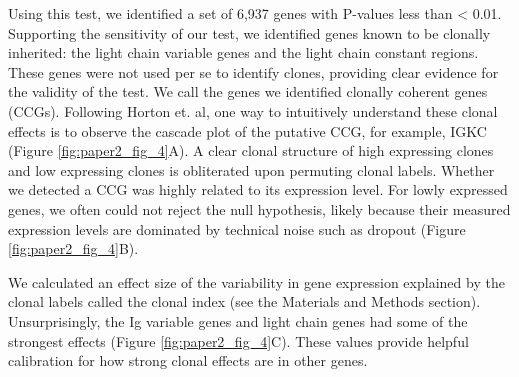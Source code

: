 Using this test, we identified a set of 6,937 genes with P-values less than < 0.01. Supporting the sensitivity of our test, we identified genes known to be clonally inherited: the light chain variable genes and the light chain constant regions. These genes were not used per se to identify clones, providing clear evidence for the validity of the test. We call the genes we identified clonally coherent genes (CCGs). Following Horton et. al\cite{horton_multiplexed_2018}, one way to intuitively understand these clonal effects is to observe the cascade plot of the putative CCG, for example, IGKC  (Figure \ref{fig:paper2_fig_4}A). A clear clonal structure of high expressing clones and low expressing clones is obliterated upon permuting clonal labels. Whether we detected a CCG was highly related to its expression level. For lowly expressed genes, we often could not reject the null hypothesis, likely because their measured expression levels are dominated by technical noise such as dropout (Figure \ref{fig:paper2_fig_4}B).

We calculated an effect size of the variability in gene expression explained by the clonal labels called the clonal index (see the Materials and Methods section). Unsurprisingly, the Ig variable genes and light chain genes had some of the strongest effects (Figure \ref{fig:paper2_fig_4}C). These values provide helpful calibration for how strong clonal effects are in other genes.

